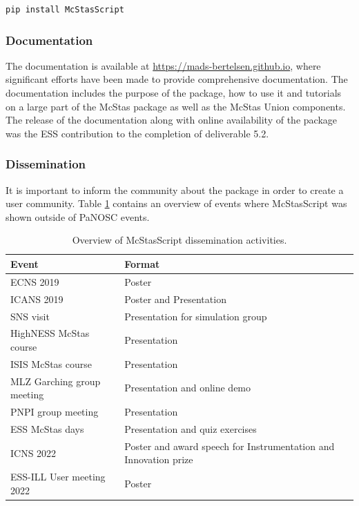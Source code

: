 \documentclass[11pt, a4paper]{article}
\begin{document}
\begin{lstlisting}[language=Python]
pip install McStasScript
\end{lstlisting}

\subsubsection{Documentation}
The documentation is available at \href{https://mads-bertelsen.github.io}{https://mads-bertelsen.github.io}, where significant efforts have been made to provide comprehensive documentation. The documentation includes the purpose of the package, how to use it and tutorials on a large part of the McStas package as well as the McStas Union components. The release of the documentation along with online availability of the package was the ESS contribution to the completion of deliverable 5.2.

\subsubsection{Dissemination}
It is important to inform the community about the package in order to create a user community. Table \ref{tab:Dissemination} contains an overview of events where McStasScript was shown outside of PaNOSC events.

\begin{table}[h!!!]
\centering
\begin{tabular}{l|l}
Event & Format \\\hline
ECNS 2019 & Poster \\
ICANS 2019 & Poster and Presentation \\
SNS visit & Presentation for simulation group \\
HighNESS McStas course & Presentation \\
ISIS McStas course & Presentation \\
MLZ Garching group meeting & Presentation and online demo \\
PNPI group meeting & Presentation \\
ESS McStas days & Presentation and quiz exercises \\
ICNS 2022 & Poster and award speech for Instrumentation and Innovation prize \\
ESS-ILL User meeting 2022 & Poster \\
\end{tabular}
\caption{\label{tab:Dissemination} Overview of McStasScript dissemination activities.}
\end{table}
\end{document}
